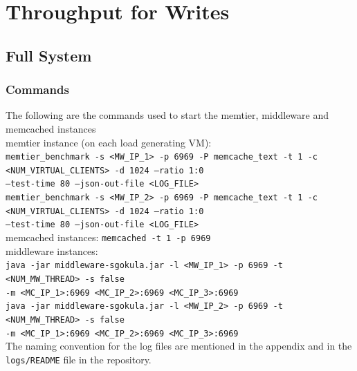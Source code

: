 \documentclass[11pt,a4paper]{article}
\newcommand\instructions[1]{\textcolor{blue}{Instructions: #1}}
\newcommand\todo[1]{\textcolor{red}{TODO: #1}}
\begin{document}
\section{Throughput for Writes} %

\subsection{Full System}


\subsubsection{Commands}
The following are the commands used to start the memtier, middleware and memcached instances \\
{\scriptsize
memtier instance (on each load generating VM): \\
\texttt{memtier\_benchmark -s <MW\_IP\_1> -p 6969 -P memcache\_text -t 1 -c <NUM\_VIRTUAL\_CLIENTS> -d 1024 --ratio 1:0 \\ --test-time 80 --json-out-file <LOG\_FILE>} \\
\texttt{memtier\_benchmark -s <MW\_IP\_2> -p 6969 -P memcache\_text -t 1 -c <NUM\_VIRTUAL\_CLIENTS> -d 1024 --ratio 1:0 \\ --test-time 80 --json-out-file <LOG\_FILE>} \\
memcached instances: \texttt{memcached -t 1 -p 6969} \\
middleware instances: \\
\texttt{java -jar middleware-sgokula.jar -l <MW\_IP\_1> -p 6969 -t <NUM\_MW\_THREAD> -s false \\ -m <MC\_IP\_1>:6969 <MC\_IP\_2>:6969 <MC\_IP\_3>:6969} \\
\texttt{java -jar middleware-sgokula.jar -l <MW\_IP\_2> -p 6969 -t <NUM\_MW\_THREAD> -s false \\ -m <MC\_IP\_1>:6969 <MC\_IP\_2>:6969 <MC\_IP\_3>:6969} \\
}
The naming convention for the log files are mentioned in the appendix and in the \texttt{logs/README} file in the repository.
\end{document}
